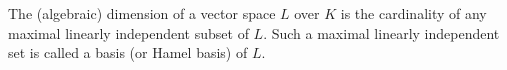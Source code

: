 The (algebraic) dimension of a vector space $L$ over $K$ is the cardinality of any maximal linearly independent subset of $L$. Such a maximal linearly independent set is called a basis (or Hamel basis) of $L$.

